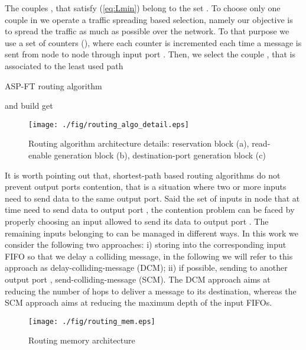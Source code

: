 \documentclass[10pt,twocolumn,journal]{IEEEtran}
\begin{document}
The couples ,  that satisfy (\ref{eq:Lmin}) belong to the set 
.
To choose only one couple in  we operate a traffic spreading based selection, namely our objective is to spread the traffic as much as 
possible over the network. To that purpose we use a set of counters (), where each counter 
 is incremented 
each time a message is sent from node  to node  through input port .
Then, we select the couple ,  that is associated 
to the least used path 

\begin{algorithm}
  \caption{ASP-FT routing algorithm}
  \label{algo:ASP-FT}
  \begin{algorithmic}[1]
    \REQUIRE  and  
    \STATE  
    \STATE  
    \FORALL{}
    \STATE build 
    \FORALL{}
    \STATE get 
    \IF{}
    \IF{}
    \STATE 
    \STATE 
    \STATE 
    \STATE 
    \ENDIF
    \ENDIF
    \ENDFOR
    \ENDFOR
    \STATE 
  \end{algorithmic}
\end{algorithm}
\begin{figure*}[th!]
  \centering
  \texttt{[image: ./fig/routing\_algo\_detail.eps]}
\caption{Routing algorithm architecture details: reservation block (a), read-enable generation block (b), 
destination-port generation block (c)}
\label{fig:routing_algo_detail}
\end{figure*}

It is worth pointing out that, shortest-path based routing algorithms do not prevent output ports contention,  
that is a situation where 
two or more inputs need to send data to the same output port. 
Said  the set of inputs in node  that at time  need to send data to output port , 
the contention problem can be faced by properly choosing an input  allowed to send its data to output port .
The remaining inputs belonging to  can be managed in different ways.
In this work we consider the following two approaches: 
i) storing  into the corresponding input FIFO so that we delay a colliding message, 
in the following we will refer to this approach as delay-colliding-message (DCM);
ii) if possible, sending  to 
another output port , send-colliding-message (SCM).
The DCM approach aims at reducing the number of hops 
to deliver a message to its destination, whereas the SCM approach aims at reducing the maximum depth of the input FIFOs.
\begin{figure}[th!]
  \centering
  \texttt{[image: ./fig/routing\_mem.eps]}
\caption{Routing memory architecture}
\label{fig:routing_mem}
\end{figure}
\end{document}
